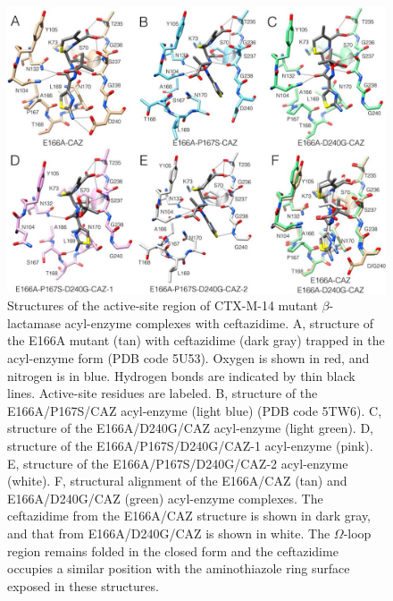 \documentclass[../main.tex]{subfiles}
\begin{document}
        \begin{figure}[!htb] %
            \centering
            \includegraphics[width=4.7in]{ch2-fig7.jpg}
            \caption[Structures of the active-site region of CTX-M-14 mutant $\beta$-lactamase acyl-enzyme complexes with ceftazidime.]
                {Structures of the active-site region of CTX-M-14 mutant $\beta$-lactamase acyl-enzyme complexes with ceftazidime. A, structure of the E166A mutant (tan) with ceftazidime (dark gray) trapped in the acyl-enzyme form (PDB code 5U53). Oxygen is shown in red, and nitrogen is in blue. Hydrogen bonds are indicated by thin black lines. Active-site residues are labeled. B, structure of the E166A/P167S/CAZ acyl-enzyme (light blue) (PDB code 5TW6). C, structure of the E166A/D240G/CAZ acyl-enzyme (light green). D, structure of the E166A/P167S/D240G/CAZ-1 acyl-enzyme (pink). E, structure of the E166A/P167S/D240G/CAZ-2 acyl-enzyme (white). F, structural alignment of the E166A/CAZ (tan) and E166A/D240G/CAZ (green) acyl-enzyme complexes. The ceftazidime from the E166A/CAZ structure is shown in dark gray, and that from E166A/D240G/CAZ is shown in white. The $\Omega$-loop region remains folded in the closed form and the ceftazidime occupies a similar position with the aminothiazole ring surface exposed in these structures.}
            \label{fig:ch2-fig7}
        \end{figure}
\end{document}
